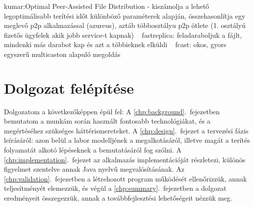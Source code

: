   kumar:Optimal Peer-Assisted File Distribution - kiszámolja a lehető legoptimálisabb terítési időt különböző paraméterek alapján, összehasonlítja egy meglevő p2p alkalmazással (azureus), aztáb többosztályu p2p ötlete (1. osztályú fizetős ügyfelek akik jobb service-t kapnak) ~\cite{kumar2006optimal}
  fastreplica: feladaraboljuk a fájlt, mindenki más darabot kap és azt a többieknek elküldi ~\cite{cherkasova2003fastreplica}
  fcast: okos, gyors egyszerű multicaston alapuló megoldás ~\cite{gemmell2000fcast}

\section{Dolgozat felépítése}

Dolgozatom a következőképpen épül fel:
A \ref{chp:background}.~fejezetben bemutatom a munkám során használt fontosabb technológiákat, és a megértéséhez szükséges háttérismereteket. A \ref{chp:design}.~fejezet a tervezési fázis leírásáról: azon belül a labor modelljének a megalkotásáról, illetve magát a terítés folyamatát alkotó lépéseknek a bemutatásáról fog szólni. A \ref{chp:implementation}.~fejezet az alkalmazás implementációját részletezi, különös figyelmet szentelve annak Java nyelvű megvalósításának. Az \ref{chp:validation}.~fejezetben a létrehozott program működését ellenőrizzük, annak teljesítményét elemezzük, és végül a \ref{chp:summary}.~fejezetben a dolgozat eredményeit összegezzük, annak a továbbfejlesztési lehetőségeit nézzük meg.
